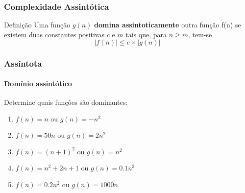 \documentclass[10pt]{beamer}
\begin{document}
\begin{frame}[t]
    \frametitle{Complexidade Assintótica}
    \begin{beamerboxesrounded}{Definição}
        Uma função $g(n)$ \textbf{domina assintoticamente} outra função f(n) se existem duas constantes positivas $c$ e $m$ tais que, para $n\geq m$, tem-se $$\left|f(n)\right| \leq c\times \left|g(n)\right|$$
    \end{beamerboxesrounded}

    \pause\begin{center}
    \end{center}
\end{frame}

\begin{frame}[t]
    \frametitle{Assíntota}
    \framesubtitle{Domínio assintótico}
    \begin{beamerboxesrounded}{Determine quais funções são dominantes:}
        \begin{enumerate}[label=\alph*)]
            \setlength\itemsep{1em}
            \item $f(n)=n$ ou $g(n)=-n^2$
            \item $f(n)=50n$ ou $g(n)=2n^2$
            \item $f(n)=(n+1)^2$ ou $g(n)=n^2$
            \item $f(n)=n^2 + 2n + 1$ ou $g(n)=0.1n^3$
            \item $f(n)=0.2n^2$ ou $g(n)=1000n$
        \end{enumerate}
    \end{beamerboxesrounded}
\end{frame}
\end{document}

